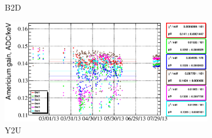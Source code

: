\documentclass[a4paper,12pt]{article}
\begin{document}
\begin{figure}
\begin{subfigure}[t]{0.49\textwidth}
\caption{B2D}
\end{subfigure}
%
\hfill
%
\begin{subfigure}[t]{0.49\textwidth}
\includegraphics[width=\textwidth]{gfx/run13_alpha_study_novoltagevariation/Y2U/c_chAmGain_by_day_Y2U.eps}
\caption{Y2U}
\end{subfigure}
%
\caption{\amgainlabel{}}
\label{fig:gainAm}
\end{figure}
\end{document}
